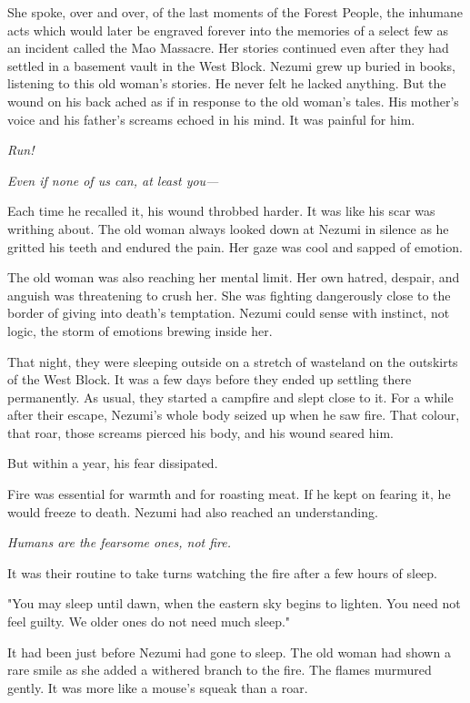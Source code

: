 She spoke, over and over, of the last moments of the Forest
People, the inhumane acts which would later be engraved forever into the
memories of a select few as an incident called the Mao Massacre. Her
stories continued even after they had settled in a basement vault in the
West Block. Nezumi grew up buried in books, listening to this old
woman's stories. He never felt he lacked anything. But the wound on his
back ached as if in response to the old woman's tales. His mother's
voice and his father's screams echoed in his mind. It was painful for
him.

\emph{Run!}

\emph{Even if none of us can, at least you---}

Each time he recalled it, his wound throbbed harder. It was like his
scar was writhing about. The old woman always looked down at Nezumi in
silence as he gritted his teeth and endured the pain. Her gaze was cool
and sapped of emotion.

The old woman was also reaching her mental limit. Her own hatred,
despair, and anguish was threatening to crush her. She was fighting
dangerously close to the border of giving into death's temptation.
Nezumi could sense with instinct, not logic, the storm of emotions
brewing inside her.

That night, they were sleeping outside on a stretch of wasteland on the
outskirts of the West Block. It was a few days before they ended up
settling there permanently. As usual, they started a campfire and slept
close to it. For a while after their escape, Nezumi's whole body seized
up when he saw fire. That colour, that roar, those screams pierced his
body, and his wound seared him.

But within a year, his fear dissipated.

Fire was essential for warmth and for roasting meat. If he kept on
fearing it, he would freeze to death. Nezumi had also reached an
understanding.

\emph{Humans are the fearsome ones, not fire.}

It was their routine to take turns watching the fire after a few hours
of sleep.

"You may sleep until dawn, when the eastern sky begins to lighten. You
need not feel guilty. We older ones do not need much sleep."

It had been just before Nezumi had gone to sleep. The old woman had
shown a rare smile as she added a withered branch to the fire. The
flames murmured gently. It was more like a mouse's squeak than a roar.

